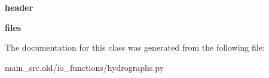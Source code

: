 \begin{DoxyCompactItemize}
\item 
\hypertarget{classmain__src_8old_1_1io__functions_1_1hydrographs_1_1Hydrographs_a353eee96055a16f4630a1802bc57d5d4}{{\bfseries header}}\label{classmain__src_8old_1_1io__functions_1_1hydrographs_1_1Hydrographs_a353eee96055a16f4630a1802bc57d5d4}

\item 
\hypertarget{classmain__src_8old_1_1io__functions_1_1hydrographs_1_1Hydrographs_aa17fa06a88b95a59100bd42f98473436}{{\bfseries files}}\label{classmain__src_8old_1_1io__functions_1_1hydrographs_1_1Hydrographs_aa17fa06a88b95a59100bd42f98473436}

\end{DoxyCompactItemize}


The documentation for this class was generated from the following file\-:\begin{DoxyCompactItemize}
\item 
main\-\_\-src.\-old/io\-\_\-functions/hydrographs.\-py\end{DoxyCompactItemize}
